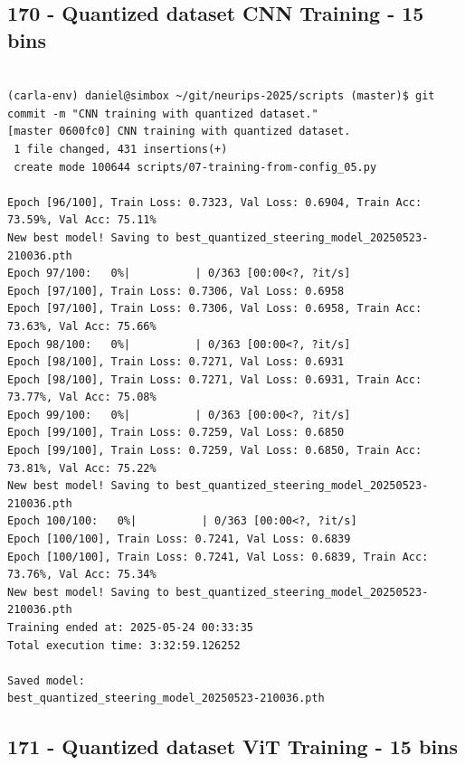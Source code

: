 \subsection{170 - Quantized dataset CNN Training - 15 bins}
\label{app_res:170}

\begin{verbatim}

(carla-env) daniel@simbox ~/git/neurips-2025/scripts (master)$ git commit -m "CNN training with quantized dataset."
[master 0600fc0] CNN training with quantized dataset.
 1 file changed, 431 insertions(+)
 create mode 100644 scripts/07-training-from-config_05.py

Epoch [96/100], Train Loss: 0.7323, Val Loss: 0.6904, Train Acc: 73.59%, Val Acc: 75.11%
New best model! Saving to best_quantized_steering_model_20250523-210036.pth
Epoch 97/100:   0%|          | 0/363 [00:00<?, ?it/s]
Epoch [97/100], Train Loss: 0.7306, Val Loss: 0.6958
Epoch [97/100], Train Loss: 0.7306, Val Loss: 0.6958, Train Acc: 73.63%, Val Acc: 75.66%
Epoch 98/100:   0%|          | 0/363 [00:00<?, ?it/s]
Epoch [98/100], Train Loss: 0.7271, Val Loss: 0.6931
Epoch [98/100], Train Loss: 0.7271, Val Loss: 0.6931, Train Acc: 73.77%, Val Acc: 75.08%
Epoch 99/100:   0%|          | 0/363 [00:00<?, ?it/s]
Epoch [99/100], Train Loss: 0.7259, Val Loss: 0.6850
Epoch [99/100], Train Loss: 0.7259, Val Loss: 0.6850, Train Acc: 73.81%, Val Acc: 75.22%
New best model! Saving to best_quantized_steering_model_20250523-210036.pth
Epoch 100/100:   0%|          | 0/363 [00:00<?, ?it/s]
Epoch [100/100], Train Loss: 0.7241, Val Loss: 0.6839
Epoch [100/100], Train Loss: 0.7241, Val Loss: 0.6839, Train Acc: 73.76%, Val Acc: 75.34%
New best model! Saving to best_quantized_steering_model_20250523-210036.pth
Training ended at: 2025-05-24 00:33:35
Total execution time: 3:32:59.126252

Saved model:
best_quantized_steering_model_20250523-210036.pth

\end{verbatim}

\subsection{171 - Quantized dataset ViT Training - 15 bins}
\label{app_res:171}


